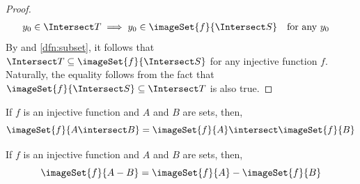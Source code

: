 \begin{proof}
    \begin{equation*}
        \begin{aligned}
            y_{0} \in \Intersect T \implies y_{0} \in \imageSet{f}{\Intersect S}&
        \end{aligned}
        \begin{aligned}
            &\text{for any \( y_{0} \)}
        \end{aligned}
    \end{equation*}
    By  and \cref{dfn:subset}, it follows that \( \Intersect T \subseteq \imageSet{f}{\Intersect S} \)
    for any injective function \( f \). Naturally, the equality follows from the fact that \( \imageSet{f}{\Intersect S} \subseteq \Intersect T\)
    is also true.
\end{proof}

\begin{cor}
    \label{thm:for-injective-functions-the-image-of-A-intersect-B-is-equal-to-the-image-of-A-intersect-the-image-of-B}
    If \( f \) is an injective function and \( A \) and \( B \) are sets, then,
    \begin{equation*}
        \imageSet{f}{A \intersect B} = \imageSet{f}{A} \intersect \imageSet{f}{B}
    \end{equation*}
\end{cor}

\begin{thm}
    \label{thm:for-injective-functions-the-difference-of-image-is-equal-to-the-image-of-difference}
    If \( f \) is an injective function and \( A \) and \( B \) are sets, then,
    \begin{equation*}
        \imageSet{f}{A - B} = \imageSet{f}{A} - \imageSet{f}{B}
    \end{equation*}
\end{thm}

